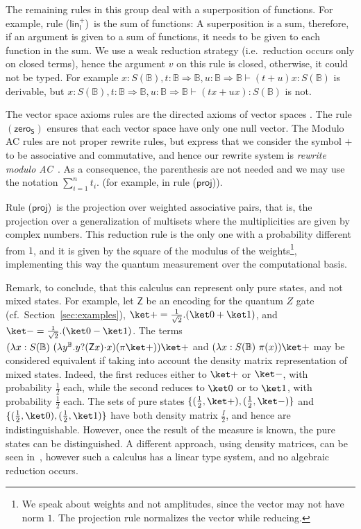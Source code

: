\documentclass[preprint]{elsarticle}
\newcommand\B{\ensuremath{\mathbb B}}
\newcommand\ite[3]{{#1}?{#2}\mathord{\cdot}{#3}}
\newcommand\pair[2]{({#1}+{#2})}
\newcommand\s[1]{\ensuremath{\mathsf{#1}}}
\newcommand\rlinl{(\s{lin^+_l})}
\newcommand\rzeroS{(\s{zero_S})}
\newcommand\rproj{(\s{proj})}
\begin{document}
The remaining rules in this group deal with a superposition of functions. For
example, rule \rlinl\ is the sum of functions: A superposition is a sum,
therefore, if an argument is given to a sum of functions, it needs to be given
to each function in the sum. We use a weak reduction strategy (i.e.~reduction
occurs only on closed terms), hence the argument $v$ on this rule is closed,
otherwise, it could not be typed. For example \(
x:S(\B),t:\B\Rightarrow\B,u:\B\Rightarrow\B\vdash\pair tux:S(\B) \) is
derivable, but \(
x:S(\B),t:\B\Rightarrow\B,u:\B\Rightarrow\B\vdash\pair{tx}{ux}:S(\B) \) is not.

The vector space axioms rules are the directed axioms of vector spaces
\cite{ArrighiDowekRTA08,AssafDiazcaroPerdrixTassonValironLMCS14}. The rule
$\rzeroS$ ensures that each vector space have only one null vector. The Modulo
AC rules are not proper rewrite rules, but express that we consider the symbol
$+$ to be associative and commutative, and hence our rewrite system is {\em
  rewrite modulo AC}~\cite{PetersonStickelJACM81}. As a consequence, the
parenthesis are not needed and we may use the notation $\sum_{i=1}^nt_i$.
(for example, in rule \rproj).

Rule \rproj\ is the projection over weighted associative pairs, that
is, the projection over a generalization of multisets where the multiplicities
are given by complex numbers. This reduction rule is the only one with a
probability different from $1$, and it is given by the square of the modulus of
the weights\footnote{We speak about weights and not amplitudes, since the vector
  may not have norm $1$. The projection rule normalizes the vector while
  reducing.}, implementing this way the quantum measurement over the
computational basis.

Remark, to conclude, that this calculus can represent only pure states, and not
mixed states. For example, let $\s Z$ be an encoding for the quantum $Z$ gate
(cf.~Section~\ref{sec:examples}), $\ket +=\frac 1{\sqrt 2}.\pair{\ket 0}{\ket
  1}$, and $\ket -=\frac 1{\sqrt 2}.(\ket 0-\ket 1)$. The terms \( (\lambda
x:S(\B)~(\lambda y^{\B}.\ite y{(\s Z x)}x)(\pi\ket +)) \ket + \) and \( (\lambda
x:S(\B)~\pi(x)) \ket +\) may be considered equivalent if taking into account the
density matrix representation of mixed states. Indeed, the first reduces either
to $\ket +$ or $\ket -$, with probability $\frac 12$ each, while the second
reduces to $\ket 0$ or to $\ket 1$, with probability $\frac 12$ each. The sets
of pure states $\{(\frac 12,\ket +),(\frac 12,\ket -)\}$ and $\{(\frac 12,\ket
0),(\frac 12,\ket 1)\}$ have both density matrix $\frac I2$, and hence are
indistinguishable. However, once the result of the measure is known, the pure
states can be distinguished. A different approach, using density matrices, can
be seen in~\cite{DiazcaroAPLAS17}, however such a calculus has a linear type
system, and no algebraic reduction occurs.
\end{document}
